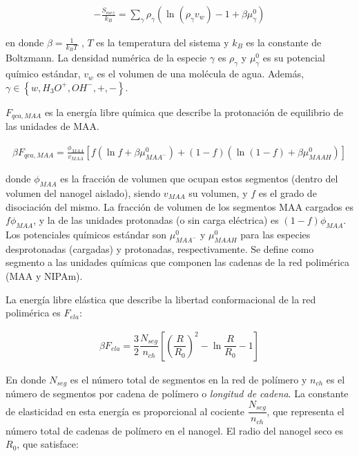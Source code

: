 	\begin{align}
		-\frac{S_{mez}}{k_B}	= \sum_{\gamma} \rho_\gamma\left(\ln\left(\rho_\gamma v_w\right) -1 + \beta\mu^0_\gamma\right) 
	\end{align}
	
	\noindent en donde  $\beta=\frac{1}{k_BT}$ , $T$ es la temperatura del sistema  y  $k_B$ es la constante de Boltzmann. La densidad num\'erica de la especie $\gamma$ es $\rho_\gamma$ y $\mu^0_\gamma$ es su potencial qu\'imico est\'andar,  $v_w$ es el volumen de una mol\'ecula de agua. Adem\'as, $\gamma \in \left\{ w, H_3O^+, OH^-, +,- \right\}$.
	
	$F_{qca,MAA}$ es la energ\'ia libre qu\'imica que describe la protonaci\'on de equilibrio de las unidades de MAA.
	
	
	\begin{align}
		\beta F_{qca, MAA} =  \frac{\phi_{MAA}}{v_{MAA}} \left[f(\ln f+ \beta\mu^0_{MAA^-}) +(1-f)(\ln (1-f)+\beta\mu^0_{MAAH})\right]
	\end{align}
	
	
	\noindent donde $\phi_{MAA}$ es la fracci\'on de volumen que ocupan estos segmentos (dentro del volumen del nanogel aislado), siendo $v_{MAA}$ su volumen, y $f$ es el grado de disociaci\'on del mismo. 
	La fracci\'on de volumen de los segmentos MAA cargados es $f\phi_{MAA}$, y la de las unidades protonadas (o sin carga el\'ectrica) es $(1-f)\phi_{MAA}$.
	Los potenciales qu\'imicos est\'andar son $\mu^0_{MAA^-}$ y $\mu^0_{MAAH}$ para las especies desprotonadas (cargadas) y protonadas, respectivamente.
	Se define como segmento a las unidades qu\'imicas que componen las cadenas de la red polim\'erica (MAA y NIPAm).
	
	
	La energ\'ia libre el\'astica que describe la libertad conformacional de la red polim\'erica es $F_{ela}$: 
	
	\begin{align}
		\beta F_{ela} = \dfrac{3}{2}\dfrac{N_{seg}}{n_{ch} }\left[\left(\dfrac{R}{R_0}\right)^2 - \ln\dfrac{R}{R_0} -1\right]
	\end{align}
	
	En donde $N_{seg}$ es el n\'umero total de segmentos en la red de pol\'imero y $n_{ch}$ es el n\'umero de segmentos por cadena de pol\'imero o \emph{longitud de cadena}.
	La constante de elasticidad en esta energ\'ia es proporcional al cociente $\dfrac{N_{seg}}{n_{ch}}$, que representa el n\'umero total de cadenas de pol\'imero en el nanogel.
	El radio del nanogel seco es $R_0$, que satisface:
	
